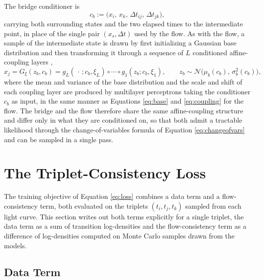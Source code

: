 The bridge conditioner is
\begin{equation}
    \label{eq:app_bridge_cond}
    c_b := \big(x_i,\, x_k,\, \Delta t_{ij},\, \Delta t_{jk}\big),
\end{equation}
carrying both surrounding states and the two elapsed times to the intermediate point, in place of the single pair $(x_s, \Delta t)$ used by the flow. As with the flow, a sample of the intermediate state is drawn by first initializing a Gaussian base distribution and then transforming it through a sequence of $L$ conditioned affine-coupling layers \parencite{Dihn2015Coupling},
\begin{equation}
    \label{eq:app_bridge_sample}
    x_j = G_\xi(z_b, c_b) = g_L(\,\cdot\,; c_b, \xi_L) \circ \cdots \circ g_1(z_b; c_b, \xi_1),
    \qquad z_b \sim \mathcal{N}\big(\mu_b(c_b),\, \sigma_b^2(c_b)\big),
\end{equation}
where the mean and variance of the base distribution and the scale and shift of each coupling layer are produced by multilayer perceptrons taking the conditioner $c_b$ as input, in the same manner as Equations \ref{eq:base} and \ref{eq:coupling} for the flow. The bridge and the flow therefore share the same affine-coupling structure and differ only in what they are conditioned on, so that both admit a tractable likelihood through the change-of-variables formula of Equation \ref{eq:changeofvars} and can be sampled in a single pass.

\section{The Triplet-Consistency Loss}
\label{app:triplet_loss}

The training objective of Equation \ref{eq:loss} combines a data term and a flow-consistency term, both evaluated on the triplets $(t_i, t_j, t_k)$ sampled from each light curve. This section writes out both terms explicitly for a single triplet, the data term as a sum of transition log-densities and the flow-consistency term as a difference of log-densities computed on Monte Carlo samples drawn from the models.

\subsection{Data Term}

